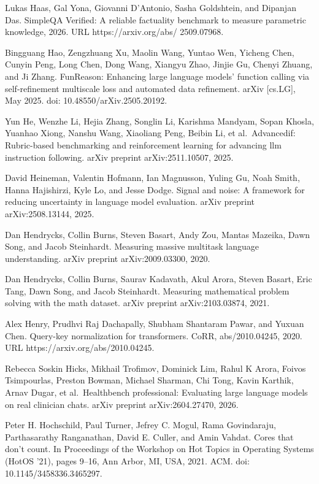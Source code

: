 \documentclass[
  10
]{article}
\begin{document}
Lukas Haas, Gal Yona, Giovanni D'Antonio, Sasha Goldshtein, and Dipanjan
Das. SimpleQA Verified: A reliable factuality benchmark to measure
parametric knowledge, 2026. URL https://arxiv.org/abs/ 2509.07968.

Bingguang Hao, Zengzhuang Xu, Maolin Wang, Yuntao Wen, Yicheng Chen,
Cunyin Peng, Long Chen, Dong Wang, Xiangyu Zhao, Jinjie Gu, Chenyi
Zhuang, and Ji Zhang. FunReason: Enhancing large language models'
function calling via self-refinement multiscale loss and automated data
refinement. arXiv {[}cs.LG{]}, May 2025. doi: 10.48550/arXiv.2505.20192.

Yun He, Wenzhe Li, Hejia Zhang, Songlin Li, Karishma Mandyam, Sopan
Khosla, Yuanhao Xiong, Nanshu Wang, Xiaoliang Peng, Beibin Li, et
al.~Advancedif: Rubric-based benchmarking and reinforcement learning for
advancing llm instruction following. arXiv preprint arXiv:2511.10507,
2025.

David Heineman, Valentin Hofmann, Ian Magnusson, Yuling Gu, Noah Smith,
Hanna Hajishirzi, Kyle Lo, and Jesse Dodge. Signal and noise: A
framework for reducing uncertainty in language model evaluation. arXiv
preprint arXiv:2508.13144, 2025.

Dan Hendrycks, Collin Burns, Steven Basart, Andy Zou, Mantas Mazeika,
Dawn Song, and Jacob Steinhardt. Measuring massive multitask language
understanding. arXiv preprint arXiv:2009.03300, 2020.

Dan Hendrycks, Collin Burns, Saurav Kadavath, Akul Arora, Steven Basart,
Eric Tang, Dawn Song, and Jacob Steinhardt. Measuring mathematical
problem solving with the math dataset. arXiv preprint arXiv:2103.03874,
2021.

Alex Henry, Prudhvi Raj Dachapally, Shubham Shantaram Pawar, and Yuxuan
Chen. Query-key normalization for transformers. CoRR, abs/2010.04245,
2020. URL https://arxiv.org/abs/2010.04245.

Rebecca Soskin Hicks, Mikhail Trofimov, Dominick Lim, Rahul K Arora,
Foivos Tsimpourlas, Preston Bowman, Michael Sharman, Chi Tong, Kavin
Karthik, Arnav Dugar, et al.~Healthbench professional: Evaluating large
language models on real clinician chats. arXiv preprint
arXiv:2604.27470, 2026.

Peter H. Hochschild, Paul Turner, Jefrey C. Mogul, Rama Govindaraju,
Parthasarathy Ranganathan, David E. Culler, and Amin Vahdat. Cores that
don't count. In Proceedings of the Workshop on Hot Topics in Operating
Systems (HotOS '21), pages 9--16, Ann Arbor, MI, USA, 2021. ACM. doi:
10.1145/3458336.3465297.
\end{document}
